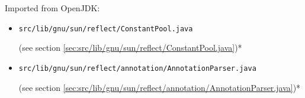 \documentclass[a4paper, 10pt, titlepage]{scrartcl} %
\begin{document}
\begin{bfseries}Imported from OpenJDK:\end{bfseries}
\begin{itemize}
 \item \begin{scriptsize}\verb|src|\hspace{0.0pt}\verb|/|\hspace{0.0pt}\verb|lib|\hspace{0.0pt}\verb|/|\hspace{0.0pt}\verb|gnu|\hspace{0.0pt}\verb|/|\hspace{0.0pt}\verb|sun|\hspace{0.0pt}\verb|/|\hspace{0.0pt}\verb|reflect|\hspace{0.0pt}\verb|/|\hspace{0.0pt}\verb|ConstantPool|\hspace{0.0pt}\verb|.|\hspace{0.0pt}\verb|java|\end{scriptsize} (see section \ref{sec:src/lib/gnu/sun/reflect/ConstantPool.java})*
 \item \begin{scriptsize}\verb|src|\hspace{0.0pt}\verb|/|\hspace{0.0pt}\verb|lib|\hspace{0.0pt}\verb|/|\hspace{0.0pt}\verb|gnu|\hspace{0.0pt}\verb|/|\hspace{0.0pt}\verb|sun|\hspace{0.0pt}\verb|/|\hspace{0.0pt}\verb|reflect|\hspace{0.0pt}\verb|/|\hspace{0.0pt}\verb|annotation|\hspace{0.0pt}\verb|/|\hspace{0.0pt}\verb|AnnotationParser|\hspace{0.0pt}\verb|.|\hspace{0.0pt}\verb|java|\end{scriptsize} (see section \ref{sec:src/lib/gnu/sun/reflect/annotation/AnnotationParser.java})*

\end{itemize}
\end{document}
